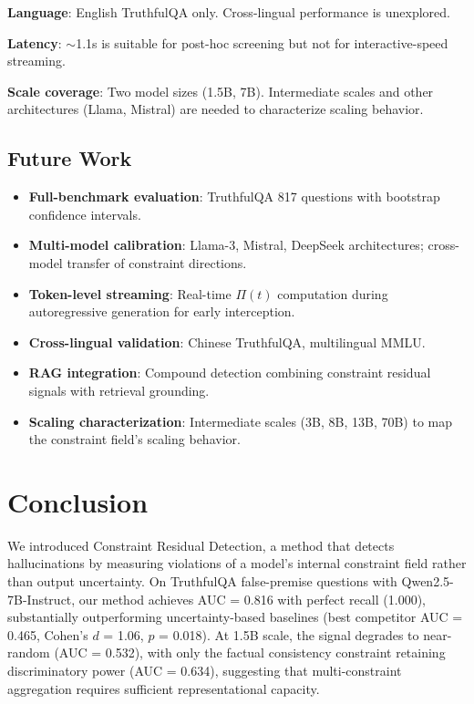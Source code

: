 \documentclass[11pt]{article}
\begin{document}
\textbf{Language}: English TruthfulQA only. Cross-lingual performance is unexplored.

\textbf{Latency}: $\sim$1.1s is suitable for post-hoc screening but not for interactive-speed streaming.

\textbf{Scale coverage}: Two model sizes (1.5B, 7B). Intermediate scales and other architectures (Llama, Mistral) are needed to characterize scaling behavior.

\subsection{Future Work}

\begin{itemize}
  \item \textbf{Full-benchmark evaluation}: TruthfulQA 817 questions with bootstrap confidence intervals.
  \item \textbf{Multi-model calibration}: Llama-3, Mistral, DeepSeek architectures; cross-model transfer of constraint directions.
  \item \textbf{Token-level streaming}: Real-time $\Pi(t)$ computation during autoregressive generation for early interception.
  \item \textbf{Cross-lingual validation}: Chinese TruthfulQA, multilingual MMLU.
  \item \textbf{RAG integration}: Compound detection combining constraint residual signals with retrieval grounding.
  \item \textbf{Scaling characterization}: Intermediate scales (3B, 8B, 13B, 70B) to map the constraint field's scaling behavior.
\end{itemize}

\section{Conclusion}

We introduced Constraint Residual Detection, a method that detects hallucinations by measuring violations of a model's internal constraint field rather than output uncertainty. On TruthfulQA false-premise questions with Qwen2.5-7B-Instruct, our method achieves AUC = 0.816 with perfect recall (1.000), substantially outperforming uncertainty-based baselines (best competitor AUC = 0.465, Cohen's $d$ = 1.06, $p$ = 0.018). At 1.5B scale, the signal degrades to near-random (AUC = 0.532), with only the factual consistency constraint retaining discriminatory power (AUC = 0.634), suggesting that multi-constraint aggregation requires sufficient representational capacity.
\end{document}
